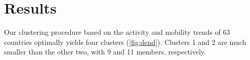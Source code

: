 \documentclass[preprint, 12pt]{elsarticle}
\newcommand{\?}{\stackrel{?}{=}}
\begin{document}









\section{Results }
Our clustering procedure based on the activity and mobility trends of 63 countries optimally yields four clusters (\autoref{fig:dend}).
Clusters 1 and 2 are much smaller than the other two, with 9 and 11 members, respectively.
\end{document}
